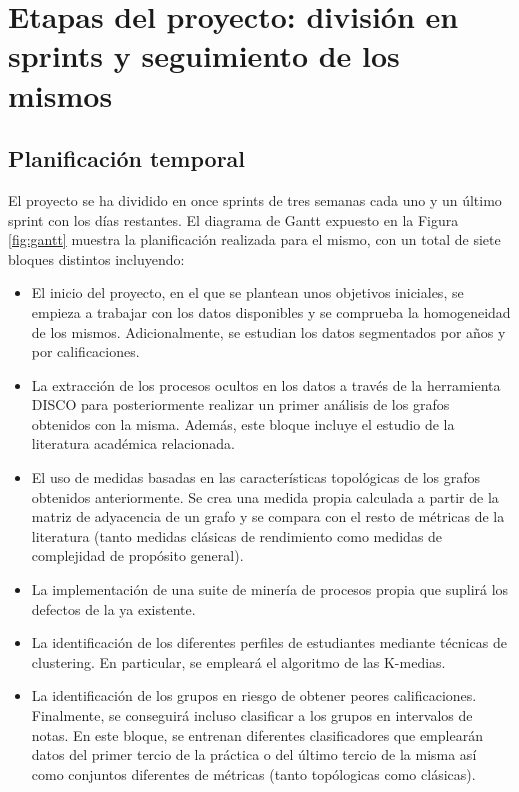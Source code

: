 \chapter{Etapas del proyecto: división en sprints y seguimiento de los mismos}\label{chapter:sprints}

\section{Planificación temporal}

El proyecto se ha dividido en once sprints de tres semanas cada uno y un último sprint con los días restantes. El diagrama de Gantt expuesto en la Figura \ref{fig:gantt} muestra la planificación realizada para el mismo, con un total de siete bloques distintos incluyendo:

\begin{itemize}
\item El inicio del proyecto, en el que se plantean unos objetivos iniciales, se empieza a trabajar con los datos disponibles y se comprueba la homogeneidad de los mismos. Adicionalmente, se estudian los datos segmentados por años y por calificaciones.
\item La extracción de los procesos ocultos en los datos a través de la herramienta DISCO para posteriormente realizar un primer análisis de los grafos obtenidos con la misma. Además, este bloque incluye el estudio de la literatura académica relacionada.
\item El uso de medidas basadas en las características topológicas de los grafos obtenidos anteriormente. Se crea una medida propia calculada a partir de la matriz de adyacencia de un grafo y se compara con el resto de métricas de la literatura (tanto medidas clásicas de rendimiento como medidas de complejidad de propósito general).
\item La implementación de una suite de minería de procesos propia que suplirá los defectos de la ya existente.
\item La identificación de los diferentes perfiles de estudiantes mediante técnicas de clustering. En particular, se empleará el algoritmo de las K-medias.
\item La identificación de los grupos en riesgo de obtener peores calificaciones. Finalmente, se conseguirá incluso clasificar a los grupos en intervalos de notas. En este bloque, se entrenan diferentes clasificadores que emplearán datos del primer tercio de la práctica o del último tercio de la misma así como conjuntos diferentes de métricas (tanto topólogicas como clásicas).
\end{itemize}

